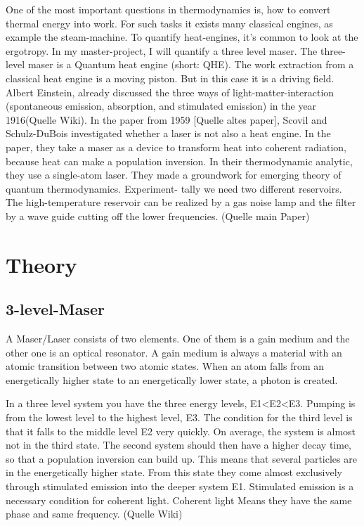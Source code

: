 \documentclass[12pt,a4paper]{article}
\begin{document}
One of the most important questions in thermodynamics is, how to convert
thermal energy into work. For such tasks it exists many classical engines, as
example the steam-machine. To quantify heat-engines, it's common to look at
the ergotropy. In my master-project, I will quantify a three level maser.
The three-level maser is a Quantum heat engine (short: QHE). The work
extraction from a classical heat engine is a moving piston. But in this case
it is a driving field. Albert Einstein, already discussed the three ways of
light-matter-interaction (spontaneous emission, absorption, and stimulated
emission) in the year 1916(Quelle Wiki). In the paper from 1959 [Quelle
altes paper], Scovil and Schulz-DuBois investigated whether a laser is not
also a heat engine. In the paper, they take a maser as a device to transform
heat into coherent radiation, because heat can make a population inversion.
In their thermodynamic analytic, they use a single-atom laser. They made a
groundwork for emerging theory of quantum thermodynamics. Experiment-
tally we need two different reservoirs. The high-temperature reservoir can be
realized by a gas noise lamp and the filter by a wave guide cutting off the
lower frequencies. (Quelle main Paper)
\section{Theory}
\subsection{3-level-Maser}
A Maser/Laser consists of two elements. One of them is a gain medium and the other one is an optical resonator. A gain medium is always a material with an atomic transition between two atomic states. When an atom falls from an energetically higher state to an energetically lower state, a photon is created.

In a three level system you have the three energy levels, E1<E2<E3. Pumping is from the lowest level to the highest level, E3. The condition for the third level is that it falls to the middle level E2 very quickly. On average, the system is almost not in the third state. The second system should then have a higher decay time, so that a population inversion can build up. This means that several particles are in the energetically higher state. From this state they come almost exclusively through stimulated emission into the deeper system E1. Stimulated emission is a necessary condition for coherent light. Coherent light Means they have the same phase and same frequency. (Quelle Wiki)
\end{document}

